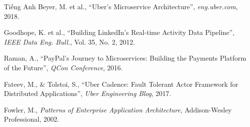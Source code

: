 \documentclass{uetgraduation}
\begin{document}
\begin{thebibliography}{9}
\begin{bibsection}{Tiếng Anh}
        Beyer, M. et al.,
        ``Uber's Microservice Architecture'',
        \textit{eng.uber.com},
        2018.

        Goodhope, K. et al.,
        ``Building LinkedIn's Real-time Activity Data Pipeline'',
        \textit{IEEE Data Eng. Bull.},
        Vol. 35, No. 2, 2012.

        Raman, A.,
        ``PayPal's Journey to Microservices: Building the Payments Platform of the Future'',
        \textit{QCon Conference},
        2016.

        Fateev, M., \& Tolstoi, S.,
        ``Uber Cadence: Fault Tolerant Actor Framework for Distributed Applications'',
        \textit{Uber Engineering Blog},
        2017.

        Fowler, M.,
        \textit{Patterns of Enterprise Application Architecture},
        Addison-Wesley Professional, 2002.
    \end{bibsection}
\end{thebibliography}
\end{document}
